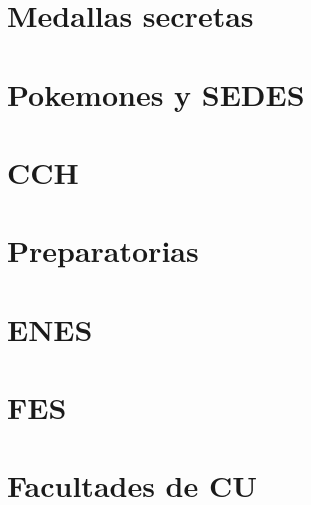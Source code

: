 \documentclass{article}
\begin{document}


\newpage
\part{Medallas secretas}


\part{Pokemones y SEDES}



\part{CCH}


\part{Preparatorias}


\part{ENES}






\part{FES}






\part{Facultades de CU}

















\end{document}
